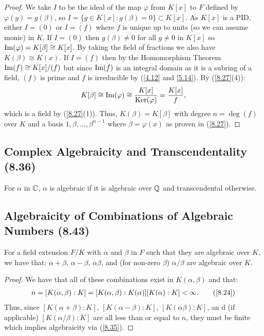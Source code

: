 \begin{proof}
    We take $I$ to be the ideal of the map $\varphi$ from $K[x]$ to $F$ defined by
    $\varphi(g) = g(\beta)$, so $I = \{g \in K[x] : g(\beta) = 0\} \subset K[x]$.
    As $K[x]$ is a PID, either $I = (0)$ or $I = (f)$ where $f$ is unique up to units
    (so we can assume monic) in $K$.
    \bs
    If $I = (0)$ then $g(\beta) \neq 0$ for all $g \neq 0$ in $K[x]$ so 
    $\operatorname{Im}(\varphi) = K[\beta] \cong K[x]$. By taking the field of fractions we also
    have $K(\beta) \cong K(x)$.
    \bs
    If $I = (f)$ then by the Homomorphism Theorem $\operatorname{Im}(f) \cong K[x] / (f)$ 
    but since $\operatorname{Im}(f)$ is an integral domain as it is a subring of a field,
    $(f)$ is prime and $f$ is irreducible by (\ref{4.12} and \ref{5.14}).
    By (\ref{8.27}(4)): \begin{align*}
        K[\beta] \cong \operatorname{Im}(\varphi) \cong \frac{K[x]}{\operatorname{Ker}(\varphi)} = \frac{K[x]}{f},
    \end{align*} which is a field by (\ref{8.27}(1)). Thus, $K(\beta) = K[\beta]$
    with degree $n = \deg(f)$ over $K$ and a basis $1, \beta, \ldots, \beta^{n - 1}$
    where $\beta = \varphi(x)$ as proven in (\ref{8.27}).
\end{proof}

\subsection{Complex Algebraicity and Transcendentality (8.36)} \label{8.36}

For $\alpha$ in $\mathbb{C}$, $\alpha$ is algebraic if it is algebraic over $\mathbb{Q}$
and transcendental otherwise.

\subsection{Algebraicity of Combinations of Algebraic Numbers (8.43)} \label{8.43}

For a field extension $F / K$ with $\alpha$ and $\beta$ in $F$ such that they are algebraic
over $K$, we have that: $\alpha + \beta$, $\alpha - \beta$, $\alpha\beta$, and
(for non-zero $\beta$) $\alpha / \beta$ are algebraic over $K$.

\begin{proof}
    We have that all of these combinations exist in $K(\alpha, \beta)$ and that: \begin{align*}
        n = [K(\alpha, \beta) : K] = [K(\alpha, \beta) : K(\alpha)][K(\alpha) : K] < \infty. 
        \tag{\ref{8.24}}
    \end{align*} Thus, since $[K(\alpha + \beta) : K]$, $[K(\alpha - \beta) : K]$,
    $[K(\alpha\beta) : K]$, an d (if applicable) $[K(\alpha / \beta) : K]$ are all less than
    or equal to $n$, they must be finite which implies algebraicity via (\ref{8.35}).
\end{proof}

